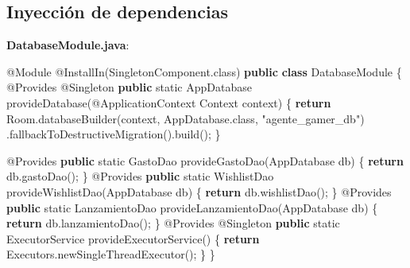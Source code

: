 \documentclass[
  spanish,
  11pt,
  paper=a4,
  ,captions=tableheading
]{scrartcl}
\newenvironment{Shaded}{}{}
\newcommand{\AttributeTok}[1]{\textcolor[rgb]{0.49,0.56,0.16}{#1}}
\newcommand{\BuiltInTok}[1]{\textcolor[rgb]{0.00,0.50,0.00}{#1}}
\newcommand{\ControlFlowTok}[1]{\textcolor[rgb]{0.00,0.44,0.13}{\textbf{#1}}}
\newcommand{\DataTypeTok}[1]{\textcolor[rgb]{0.56,0.13,0.00}{#1}}
\newcommand{\FunctionTok}[1]{\textcolor[rgb]{0.02,0.16,0.49}{#1}}
\newcommand{\KeywordTok}[1]{\textcolor[rgb]{0.00,0.44,0.13}{\textbf{#1}}}
\newcommand{\NormalTok}[1]{#1}
\newcommand{\OperatorTok}[1]{\textcolor[rgb]{0.40,0.40,0.40}{#1}}
\newcommand{\StringTok}[1]{\textcolor[rgb]{0.25,0.44,0.63}{#1}}
\begin{document}
\hypertarget{inyecciuxf3n-de-dependencias}{%
\subsection{Inyección de
dependencias}\label{inyecciuxf3n-de-dependencias}}

\textbf{DatabaseModule.java}:

\begin{Shaded}
\begin{Highlighting}[]
\AttributeTok{@Module}
\AttributeTok{@InstallIn}\OperatorTok{(}\NormalTok{SingletonComponent}\OperatorTok{.}\FunctionTok{class}\OperatorTok{)}
\KeywordTok{public} \KeywordTok{class}\NormalTok{ DatabaseModule }\OperatorTok{\{}
    \AttributeTok{@Provides} \AttributeTok{@Singleton}
    \KeywordTok{public} \DataTypeTok{static}\NormalTok{ AppDatabase }\FunctionTok{provideDatabase}\OperatorTok{(}\AttributeTok{@ApplicationContext} \BuiltInTok{Context}\NormalTok{ context}\OperatorTok{)} \OperatorTok{\{}
        \ControlFlowTok{return}\NormalTok{ Room}\OperatorTok{.}\FunctionTok{databaseBuilder}\OperatorTok{(}\NormalTok{context}\OperatorTok{,}\NormalTok{ AppDatabase}\OperatorTok{.}\FunctionTok{class}\OperatorTok{,} \StringTok{"agente\_gamer\_db"}\OperatorTok{)}
            \OperatorTok{.}\FunctionTok{fallbackToDestructiveMigration}\OperatorTok{().}\FunctionTok{build}\OperatorTok{();}
    \OperatorTok{\}}

    \AttributeTok{@Provides} \KeywordTok{public} \DataTypeTok{static}\NormalTok{ GastoDao }\FunctionTok{provideGastoDao}\OperatorTok{(}\NormalTok{AppDatabase db}\OperatorTok{)} \OperatorTok{\{}
        \ControlFlowTok{return}\NormalTok{ db}\OperatorTok{.}\FunctionTok{gastoDao}\OperatorTok{();}
    \OperatorTok{\}}
    \AttributeTok{@Provides} \KeywordTok{public} \DataTypeTok{static}\NormalTok{ WishlistDao }\FunctionTok{provideWishlistDao}\OperatorTok{(}\NormalTok{AppDatabase db}\OperatorTok{)} \OperatorTok{\{}
        \ControlFlowTok{return}\NormalTok{ db}\OperatorTok{.}\FunctionTok{wishlistDao}\OperatorTok{();}
    \OperatorTok{\}}
    \AttributeTok{@Provides} \KeywordTok{public} \DataTypeTok{static}\NormalTok{ LanzamientoDao }\FunctionTok{provideLanzamientoDao}\OperatorTok{(}\NormalTok{AppDatabase db}\OperatorTok{)} \OperatorTok{\{}
        \ControlFlowTok{return}\NormalTok{ db}\OperatorTok{.}\FunctionTok{lanzamientoDao}\OperatorTok{();}
    \OperatorTok{\}}
    \AttributeTok{@Provides} \AttributeTok{@Singleton}
    \KeywordTok{public} \DataTypeTok{static} \BuiltInTok{ExecutorService} \FunctionTok{provideExecutorService}\OperatorTok{()} \OperatorTok{\{}
        \ControlFlowTok{return} \BuiltInTok{Executors}\OperatorTok{.}\FunctionTok{newSingleThreadExecutor}\OperatorTok{();}
    \OperatorTok{\}}
\OperatorTok{\}}
\end{Highlighting}
\end{Shaded}
\end{document}
